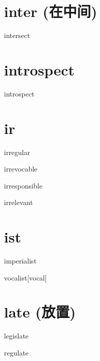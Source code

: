 \section{inter (在中间)}

\begin{RefWord}{intersect}
\end{RefWord}

\section{introspect}

\begin{RefWord}{introspect}
\end{RefWord}

\section{ir} 

\begin{RefWord}{irregular}
\end{RefWord}

\begin{RefWord}{irrevocable}
\end{RefWord}

\begin{RefWord}{irresponsible}
\end{RefWord}

\begin{RefWord}{irrelevant}
\end{RefWord}

\section{ist}

\begin{RefWord}{imperialist}
\end{RefWord}

\begin{RefWord}{vocalist}[vocal]
\end{RefWord}

\section{late (放置)}

\begin{RefWord}{legislate}
\end{RefWord}

\begin{RefWord}{regulate}
\end{RefWord}

